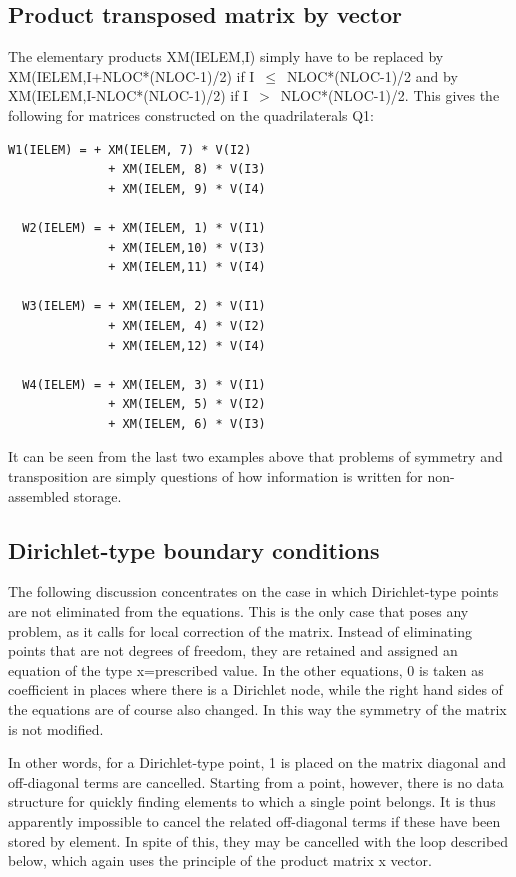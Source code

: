 \subsection{Product transposed matrix by vector}

The elementary products XM(IELEM,I) simply have to be replaced by
XM(IELEM,I+NLOC*(NLOC-1)/2) if I~$\mathrm{\le}$~NLOC*(NLOC-1)/2 and by
XM(IELEM,I-NLOC*(NLOC-1)/2) if I~$>$~NLOC*(NLOC-1)/2. This gives the following
for matrices constructed on the quadrilaterals Q1:

\begin{lstlisting}[language=TelFortran]
  W1(IELEM) = + XM(IELEM, 7) * V(I2)
              + XM(IELEM, 8) * V(I3)
              + XM(IELEM, 9) * V(I4)

  W2(IELEM) = + XM(IELEM, 1) * V(I1)
              + XM(IELEM,10) * V(I3)
              + XM(IELEM,11) * V(I4)

  W3(IELEM) = + XM(IELEM, 2) * V(I1)
              + XM(IELEM, 4) * V(I2)
              + XM(IELEM,12) * V(I4)

  W4(IELEM) = + XM(IELEM, 3) * V(I1)
              + XM(IELEM, 5) * V(I2)
              + XM(IELEM, 6) * V(I3)
\end{lstlisting}

It can be seen from the last two examples above that problems of symmetry and
transposition are simply questions of how information is written for
non-assembled storage.

\subsection{Dirichlet-type boundary conditions}
\label{ref:dirichletbnd}

The following discussion concentrates on the case in which Dirichlet-type
points are not eliminated from the equations. This is the only case that poses
any problem, as it calls for local correction of the matrix. Instead of
eliminating points that are not degrees of freedom, they are retained and
assigned an equation of the type x=prescribed value. In the other equations, 0
is taken as coefficient in places where there is a Dirichlet node, while the
right hand sides of the equations are of course also changed. In this way the
symmetry of the matrix is not modified.

In other words, for a Dirichlet-type point, 1 is placed on the matrix diagonal
and off-diagonal terms are cancelled. Starting from a point, however, there is
no data structure for quickly finding elements to which a single point belongs.
It is thus apparently impossible to cancel the related off-diagonal terms if
these have been stored by element. In spite of this, they may be cancelled with
the loop described below, which again uses the principle of the product matrix
x vector.

